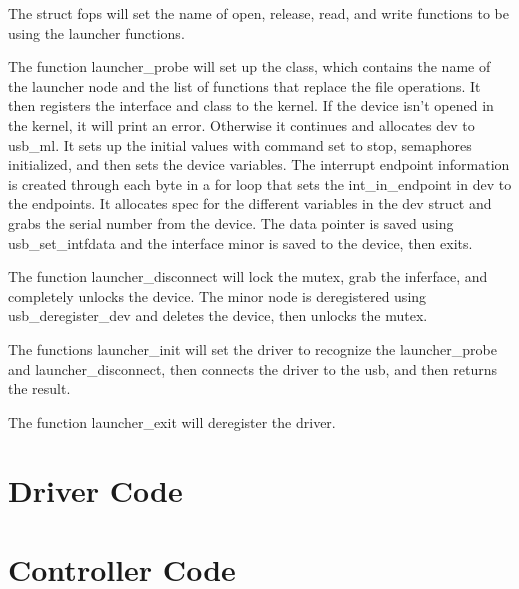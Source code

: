 \documentclass[letterpaper,10pt,titlepage]{article}
\begin{document}
The struct fops will set the name of open, release, read, and write functions to be using the launcher functions.

The function launcher\_probe will set up the class, which contains the name of the launcher node and the list of functions that replace the file operations. It then registers the interface and class to the kernel. If the device isn't opened in the kernel, it will print an error. Otherwise it continues and allocates dev to usb\_ml. It sets up the initial values with command set to stop, semaphores initialized, and then sets the device variables. The interrupt endpoint information is created through each byte in a for loop that sets the int\_in\_endpoint in dev to the endpoints. It allocates spec for the different variables in the dev struct and grabs the serial number from the device. The data pointer is saved using usb\_set\_intfdata and the interface minor is saved to the device, then exits.

The function launcher\_disconnect will lock the mutex, grab the inferface, and completely unlocks the device. The minor node is deregistered using usb\_deregister\_dev and deletes the device, then unlocks the mutex.

The functions launcher\_init will set the driver to recognize the launcher\_probe and launcher\_disconnect, then connects the driver to the usb, and then returns the result.

The function launcher\_exit will deregister the driver.


\newpage
\section{Driver Code}

\newpage
\section{Controller Code}


%
%
\end{document}
